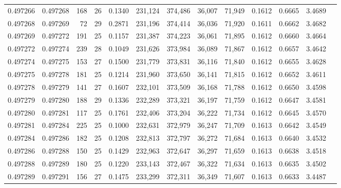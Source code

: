 \begin{tabular}{rrrrrrrrrrrrr}
0.497266 & 0.497268 & 168 &  26 &                                     0.1340 & 231,124 & 374,486 &  36,007 &  71,949 & 0.1612 & 0.6665 & 3.4689 \\
0.497268 & 0.497269 &  72 &  29 &                                     0.2871 & 231,196 & 374,414 &  36,036 &  71,920 & 0.1611 & 0.6662 & 3.4682 \\
0.497269 & 0.497272 & 191 &  25 &                                     0.1157 & 231,387 & 374,223 &  36,061 &  71,895 & 0.1612 & 0.6660 & 3.4664 \\
0.497272 & 0.497274 & 239 &  28 &                                     0.1049 & 231,626 & 373,984 &  36,089 &  71,867 & 0.1612 & 0.6657 & 3.4642 \\
0.497274 & 0.497275 & 153 &  27 &                                     0.1500 & 231,779 & 373,831 &  36,116 &  71,840 & 0.1612 & 0.6655 & 3.4628 \\
0.497275 & 0.497278 & 181 &  25 &                                     0.1214 & 231,960 & 373,650 &  36,141 &  71,815 & 0.1612 & 0.6652 & 3.4611 \\
0.497278 & 0.497279 & 141 &  27 &                                     0.1607 & 232,101 & 373,509 &  36,168 &  71,788 & 0.1612 & 0.6650 & 3.4598 \\
0.497279 & 0.497280 & 188 &  29 &                                     0.1336 & 232,289 & 373,321 &  36,197 &  71,759 & 0.1612 & 0.6647 & 3.4581 \\
0.497280 & 0.497281 & 117 &  25 &                                     0.1761 & 232,406 & 373,204 &  36,222 &  71,734 & 0.1612 & 0.6645 & 3.4570 \\
0.497281 & 0.497284 & 225 &  25 &                                     0.1000 & 232,631 & 372,979 &  36,247 &  71,709 & 0.1613 & 0.6642 & 3.4549 \\
0.497284 & 0.497286 & 182 &  25 &                                     0.1208 & 232,813 & 372,797 &  36,272 &  71,684 & 0.1613 & 0.6640 & 3.4532 \\
0.497286 & 0.497288 & 150 &  25 &                                     0.1429 & 232,963 & 372,647 &  36,297 &  71,659 & 0.1613 & 0.6638 & 3.4518 \\
0.497288 & 0.497289 & 180 &  25 &                                     0.1220 & 233,143 & 372,467 &  36,322 &  71,634 & 0.1613 & 0.6635 & 3.4502 \\
0.497289 & 0.497291 & 156 &  27 &                                     0.1475 & 233,299 & 372,311 &  36,349 &  71,607 & 0.1613 & 0.6633 & 3.4487 \\

\end{tabular}
